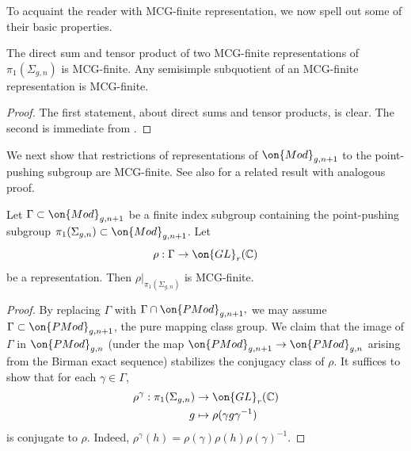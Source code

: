 To acquaint the reader with MCG-finite representation, we now spell out some of
their basic properties.

\begin{proposition}
\notready\label{proposition:basic-properties}
	The direct sum and tensor product of two MCG-finite representations of $\pi_1(\Sigma_{g,n})$ is MCG-finite. Any semisimple subquotient of an MCG-finite representation is MCG-finite.
\end{proposition}
\begin{proof}
The first statement, about direct sums and tensor products, is clear. The second is immediate from \cite[Lemma 2.2.1]{lawrence2019representations}.
\end{proof}

We next show that restrictions of representations of $\on{Mod}_{g,n+1}$ to the
point-pushing subgroup are MCG-finite. See also \cite[Lemma
2.2]{kasahara2015visualization} for a related result with analogous proof.

\begin{proposition}
\notready\label{proposition:MCG-finite-index-rep}
	Let $\Gamma\subset \on{Mod}_{g,n+1}$ be a finite index subgroup
	containing the point-pushing subgroup $\pi_1(\Sigma_{g,n})\subset
	\on{Mod}_{g,n+1}$. Let $$\rho:\Gamma\to \on{GL}_r(\mathbb{C})$$ be a representation. Then $\rho|_{\pi_1(\Sigma_{g,n})}$ is MCG-finite.
\end{proposition}
\begin{proof}
	By replacing $\Gamma$ with
	$\Gamma \cap \on{PMod}_{g,n+1},$
	we may assume $\Gamma \subset \on{PMod}_{g,n+1}$,
	the pure mapping class group.  We claim that the image of $\Gamma$ in
	$\on{PMod}_{g,n}$ (under the map $\on{PMod}_{g,n+1}\to \on{PMod}_{g,n}$
	arising from the Birman exact sequence) stabilizes the conjugacy class
	of $\rho$.
	It suffices to show that for each $\gamma\in \Gamma$,
\begin{align*}
	\rho^\gamma:  \pi_1(\Sigma_{g,n})& \rightarrow \on{GL}_r(\mathbb C) \\
	g & \mapsto \rho(\gamma g \gamma^{-1})
\end{align*}
is conjugate to $\rho$. Indeed, $\rho^\gamma(h) = \rho(\gamma) \rho(h)
\rho(\gamma)^{-1}$.
\end{proof}

